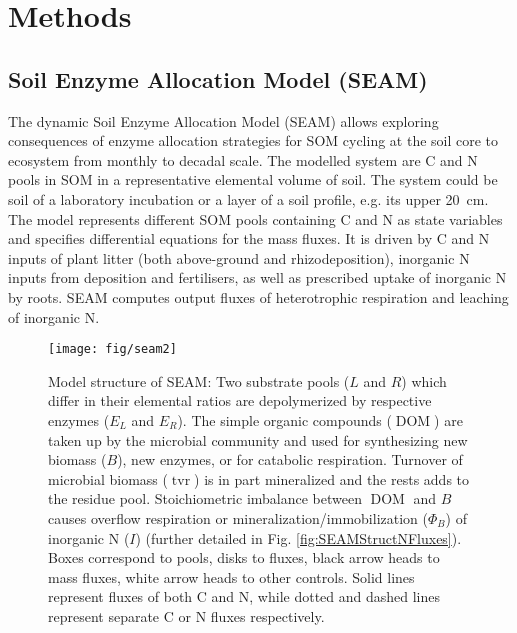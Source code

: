 \section{Methods}
\subsection{Soil Enzyme Allocation Model (SEAM)}
\label{sec:SEAM}

The dynamic Soil Enzyme Allocation Model (SEAM) allows exploring consequences of
enzyme allocation strategies for SOM cycling at the soil core to ecosystem from
monthly to decadal scale. The modelled system are C and N pools in SOM in a
representative elemental volume of soil. The system could be soil of a
laboratory incubation or a layer of a soil profile, e.g. its upper 20~\unit{cm}.
The model represents different SOM pools containing C and N as state variables
and specifies differential equations for the mass fluxes. It is driven by C and
N inputs of plant litter (both above-ground and rhizodeposition), inorganic N
inputs from deposition and fertilisers, as well as prescribed uptake of
inorganic N by roots. SEAM computes output fluxes of heterotrophic respiration
and leaching of inorganic N.

\begin{figure}[t] \vspace*{2mm}
\begin{center}
\texttt{[image: fig/seam2]}
\end{center}
\caption{
Model structure of SEAM: Two substrate pools ($L$ and $R$) which differ in their
elemental ratios are depolymerized by respective enzymes ($E_L$ and $E_R$). The
simple organic compounds ($\operatorname{DOM}$) are taken up by the microbial
community  and used for synthesizing new biomass (${B}$), new enzymes, or for
catabolic respiration. Turnover of microbial biomass ($\operatorname{tvr}$) is
in part mineralized and the rests adds to the residue pool.
Stoichiometric imbalance between $\operatorname{DOM}$ and ${B}$ causes overflow
respiration or mineralization/immobilization ($\Phi_B$) of inorganic N ($I$)
(further detailed in Fig. \ref{fig:SEAMStructNFluxes}).
Boxes correspond to pools, disks to fluxes, black arrow heads to mass fluxes,
white arrow heads to other controls. Solid lines represent fluxes of both C and
N, while dotted and dashed lines represent separate C or N fluxes respectively.
\label{fig:SEAMStruct}
}
\end{figure}


